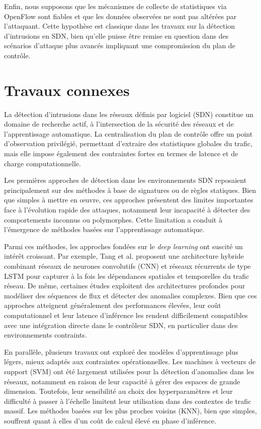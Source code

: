 \documentclass[11pt]{article}
\begin{document}
Enfin, nous supposons que les mécanismes de collecte de statistiques via OpenFlow sont fiables et que les données observées ne sont pas altérées par l’attaquant. Cette hypothèse est classique dans les travaux sur la détection d’intrusions en SDN, bien qu’elle puisse être remise en question dans des scénarios d’attaque plus avancés impliquant une compromission du plan de contrôle.



\section{Travaux connexes}\label{sec:related_work}

La détection d’intrusions dans les réseaux définis par logiciel (SDN) constitue un domaine de recherche actif, à l’intersection de la sécurité des réseaux et de l’apprentissage automatique. La centralisation du plan de contrôle offre un point d’observation privilégié, permettant d’extraire des statistiques globales du trafic, mais elle impose également des contraintes fortes en termes de latence et de charge computationnelle.

Les premières approches de détection dans les environnements SDN reposaient principalement sur des méthodes à base de signatures ou de règles statiques. Bien que simples à mettre en œuvre, ces approches présentent des limites importantes face à l’évolution rapide des attaques, notamment leur incapacité à détecter des comportements inconnus ou polymorphes. Cette limitation a conduit à l’émergence de méthodes basées sur l’apprentissage automatique.

Parmi ces méthodes, les approches fondées sur le \textit{deep learning} ont suscité un intérêt croissant. Par exemple, Tang et al. \cite{ref1} proposent une architecture hybride combinant réseaux de neurones convolutifs (CNN) et réseaux récurrents de type LSTM pour capturer à la fois les dépendances spatiales et temporelles du trafic réseau. De même, certaines études exploitent des architectures profondes pour modéliser des séquences de flux et détecter des anomalies complexes. Bien que ces approches atteignent généralement des performances élevées, leur coût computationnel et leur latence d’inférence les rendent difficilement compatibles avec une intégration directe dans le contrôleur SDN, en particulier dans des environnements contraints.

En parallèle, plusieurs travaux ont exploré des modèles d’apprentissage plus légers, mieux adaptés aux contraintes opérationnelles. Les machines à vecteurs de support (SVM) ont été largement utilisées pour la détection d’anomalies dans les réseaux, notamment en raison de leur capacité à gérer des espaces de grande dimension. Toutefois, leur sensibilité au choix des hyperparamètres et leur difficulté à passer à l’échelle limitent leur utilisation dans des contextes de trafic massif. Les méthodes basées sur les plus proches voisins (KNN), bien que simples, souffrent quant à elles d’un coût de calcul élevé en phase d’inférence.
\end{document}
